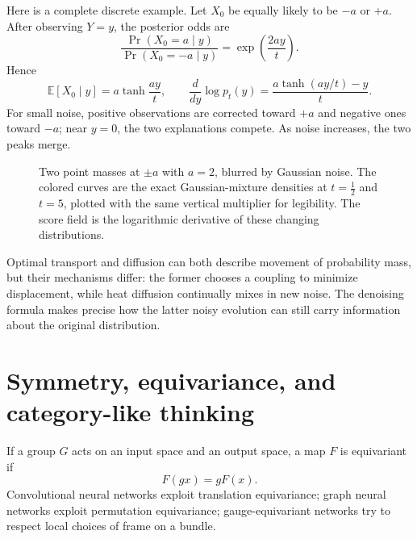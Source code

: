 Here is a complete discrete example. Let $X_0$ be equally likely to be $-a$ or $+a$. After observing $Y=y$, the posterior odds are
\[
 \frac{\Pr(X_0=a\mid y)}{\Pr(X_0=-a\mid y)}
 =\exp\left(\frac{2ay}{t}\right).
\]
Hence
\[
 \mathbb E[X_0\mid y]=a\tanh\frac{ay}{t},
 \qquad
 \boxed{\frac d{dy}\log p_t(y)
       =\frac{a\tanh(ay/t)-y}{t}.}
\]
For small noise, positive observations are corrected toward $+a$ and negative ones toward $-a$; near $y=0$, the two explanations compete. As noise increases, the two peaks merge.

\begin{figure}[H]
\centering
{}
\caption{Two point masses at $\pm a$ with $a=2$, blurred by Gaussian noise. The colored curves are the exact Gaussian-mixture densities at $t=\tfrac12$ and $t=5$, plotted with the same vertical multiplier for legibility. The score field is the logarithmic derivative of these changing distributions.}
\end{figure}

Optimal transport and diffusion can both describe movement of probability mass, but their mechanisms differ: the former chooses a coupling to minimize displacement, while heat diffusion continually mixes in new noise. The denoising formula makes precise how the latter noisy evolution can still carry information about the original distribution.

\section{Symmetry, equivariance, and category-like thinking}

If a group $G$ acts on an input space and an output space, a map $F$ is equivariant if
\[
  F(gx)=gF(x).
\]
Convolutional neural networks exploit translation equivariance; graph neural networks exploit permutation equivariance; gauge-equivariant networks try to respect local choices of frame on a bundle.

